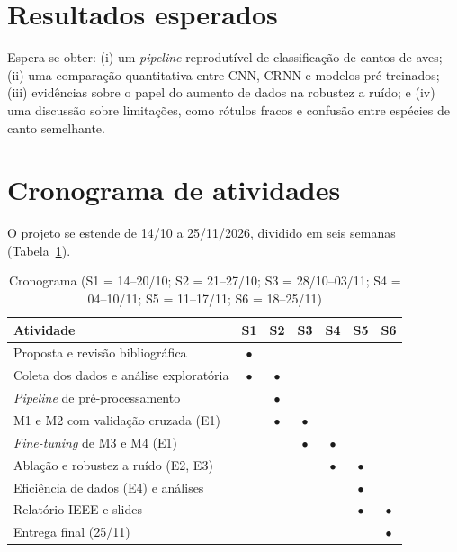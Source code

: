 \documentclass[conference]{IEEEtran}
\begin{document}
\section{Resultados esperados}
Espera-se obter: (i) um \textit{pipeline} reprodutível de classificação de cantos de aves; (ii) uma comparação quantitativa entre CNN, CRNN e modelos pré-treinados; (iii) evidências sobre o papel do aumento de dados na robustez a ruído; e (iv) uma discussão sobre limitações, como rótulos fracos e confusão entre espécies de canto semelhante.

\section{Cronograma de atividades}
O projeto se estende de 14/10 a 25/11/2026, dividido em seis semanas (Tabela~\ref{tab:crono}).

\begin{table}[htbp]
\caption{Cronograma (S1 = 14--20/10; S2 = 21--27/10; S3 = 28/10--03/11; S4 = 04--10/11; S5 = 11--17/11; S6 = 18--25/11)}
\label{tab:crono}
\centering
\footnotesize
\setlength{\tabcolsep}{3pt}
\begin{tabular}{@{}>{\raggedright\arraybackslash}p{3.6cm}cccccc@{}}
\toprule
\textbf{Atividade} & \textbf{S1} & \textbf{S2} & \textbf{S3} & \textbf{S4} & \textbf{S5} & \textbf{S6} \\
\midrule
Proposta e revisão bibliográfica & $\bullet$ & & & & & \\
Coleta dos dados e análise exploratória & $\bullet$ & $\bullet$ & & & & \\
\textit{Pipeline} de pré-processamento & & $\bullet$ & & & & \\
M1 e M2 com validação cruzada (E1) & & $\bullet$ & $\bullet$ & & & \\
\textit{Fine-tuning} de M3 e M4 (E1) & & & $\bullet$ & $\bullet$ & & \\
Ablação e robustez a ruído (E2, E3) & & & & $\bullet$ & $\bullet$ & \\
Eficiência de dados (E4) e análises & & & & & $\bullet$ & \\
Relatório IEEE e slides & & & & & $\bullet$ & $\bullet$ \\
Entrega final (25/11) & & & & & & $\bullet$ \\
\bottomrule
\end{tabular}
\end{table}
\end{document}
